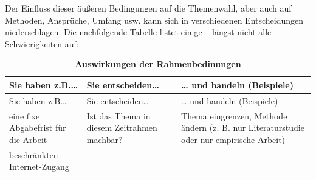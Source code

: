 \documentclass[]{book}
\theoremstyle{definition}
\theoremstyle{definition}
\theoremstyle{definition}
\theoremstyle{remark}
\begin{document}
Der Einfluss dieser äußeren Bedingungen auf die Themenwahl, aber auch
auf Methoden, Ansprüche, Umfang usw. kann sich in verschiedenen
Entscheidungen niederschlagen. Die nachfolgende Tabelle listet einige --
längst nicht alle -- Schwierigkeiten auf:

\begin{longtable}[]{@{}lll@{}}
\caption{\textbf{\label{tab:auswirkungen} Auswirkungen der
Rahmenbedinungen}}\tabularnewline
\toprule
\begin{minipage}[b]{0.26\columnwidth}\raggedright\strut
Sie haben z.B.\ldots{}\strut
\end{minipage} & \begin{minipage}[b]{0.30\columnwidth}\raggedright\strut
Sie entscheiden\ldots{}\strut
\end{minipage} & \begin{minipage}[b]{0.35\columnwidth}\raggedright\strut
\ldots{} und handeln (Beispiele)\strut
\end{minipage}\tabularnewline
\midrule
\endfirsthead
\toprule
\begin{minipage}[b]{0.26\columnwidth}\raggedright\strut
Sie haben z.B.\ldots{}\strut
\end{minipage} & \begin{minipage}[b]{0.30\columnwidth}\raggedright\strut
Sie entscheiden\ldots{}\strut
\end{minipage} & \begin{minipage}[b]{0.35\columnwidth}\raggedright\strut
\ldots{} und handeln (Beispiele)\strut
\end{minipage}\tabularnewline
\midrule
\endhead
\begin{minipage}[t]{0.26\columnwidth}\raggedright\strut
eine fixe Abgabefrist für die Arbeit\strut
\end{minipage} & \begin{minipage}[t]{0.30\columnwidth}\raggedright\strut
Ist das Thema in diesem Zeitrahmen machbar?\strut
\end{minipage} & \begin{minipage}[t]{0.35\columnwidth}\raggedright\strut
Thema eingrenzen, Methode ändern (z. B. nur Literaturstudie oder nur
empirische Arbeit) \vspace{5mm}\strut
\end{minipage}\tabularnewline
\begin{minipage}[t]{0.26\columnwidth}\raggedright\strut
beschränkten Internet-Zugang\strut
\end{minipage} & \begin{minipage}[t]{0.30\columnwidth}\raggedright\strut

\end{minipage}
\end{longtable}
\end{document}
